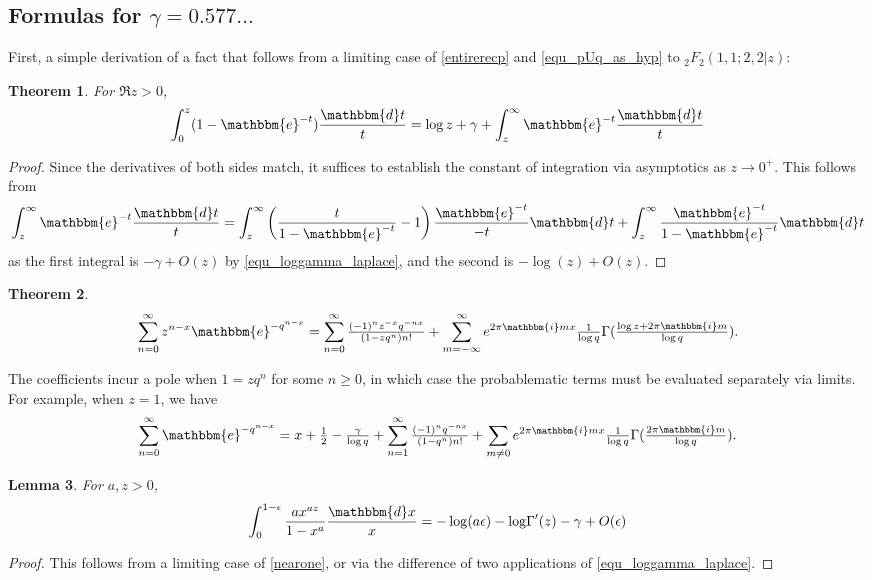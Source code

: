 \documentclass[12pt]{article}
\newcommand{\logG} {\operatorname {log \Gamma}}
\newcommand{\ee}[0] {\mathbbm{e}}
\newcommand{\ii}[0] {\mathbbm{i}}
\newcommand{\dd}[0] {\mathbbm{d}}
\numberwithin{equation}{section}
\newtheorem{theorem}{Theorem}[section]
\newtheorem{lemma}[theorem]{Lemma}
\newcommand{\FFf}[5] {{}_{#1}{#2}_{#3} \left(#4 | {#5} \right)}
\begin{document}
\subsection{Formulas for $\gamma = 0.577 \dots$}
First, a simple derivation of a fact that follows from a limiting case of \eqref{entirerecp}
 and \eqref{equ_pUq_as_hyp} to $\FFf{2}{F}{2}{1,1;2,2}{z}$:
\begin{theorem}
For $\Re z > 0$,
\begin{equation*}
\int_{0}^{z} (1-\ee^{-t}) \frac{\dd t}{t}
 = \log z + \gamma + \int_{z}^{\infty} \ee^{-t} \frac{\dd t}{t}
\end{equation*}
\end{theorem}
\begin{proof}
Since the derivatives of both sides match, it suffices to establish the constant of integration via asymptotics as $z\to0^{+}$. This follows from
\begin{equation*}
\int_{z}^{\infty} \ee^{-t} \frac{\dd t}{t} = \int_{z}^{\infty} \left(\frac{t}{1-\ee^{-t}}-1 \right) \frac{\ee^{-t}}{-t} \dd t + \int_{z}^{\infty} \frac{\ee^{-t}}{1-\ee^{-t}} \dd t
\end{equation*}
as the first integral is $-\gamma + O(z)$ by \eqref{equ_loggamma_laplace}, and the second is $-\log(z) + O(z)$.
\end{proof}

\begin{theorem}
\begin{equation*}
\sum_{n=0}^{\infty}z^{n-x} \ee^{-q^{n-x}} = \sum_{n=0}^{\infty} \tfrac{(-1)^n z^{-x} q^{-n x}}{(1-z q^n)n!} + \sum_{m=-\infty}^{\infty} e^{2\pi \ii m x} \tfrac{1}{\log q}\Gamma(\tfrac{\log z + 2 \pi \ii m}{\log q})\text{.}
\end{equation*}
\end{theorem}
The coefficients incur a pole when $1=z q^n$ for some $n \ge 0$, in which case the probablematic terms must be evaluated separately via limits. For example, when $z=1$, we have
\begin{equation*}
\sum_{n=0}^{\infty} \ee^{-q^{n-x}} = x + \tfrac{1}{2} - \tfrac{\gamma}{\log q} + \sum_{n=1}^{\infty} \tfrac{(-1)^n q^{-n x}}{(1-q^n)n!} + \sum_{m \ne 0} e^{2\pi \ii m x}
\tfrac{1}{\log q}\Gamma(\tfrac{2 \pi \ii m}{\log q})\text{.}
\end{equation*}


\begin{lemma}
For $a,z>0$,
\begin{equation*}
\int_{0}^{1-\epsilon} \frac{a x^{a z}}{1-x^a} \frac{\dd x}{x} = - \log(a \epsilon) -\logG'(z)-\gamma + O(\epsilon)
\end{equation*}
\end{lemma}
\begin{proof}
This follows from a limiting case of \eqref{nearone}, or via the difference of two applications of \eqref{equ_loggamma_laplace}.
\end{proof}
\end{document}
